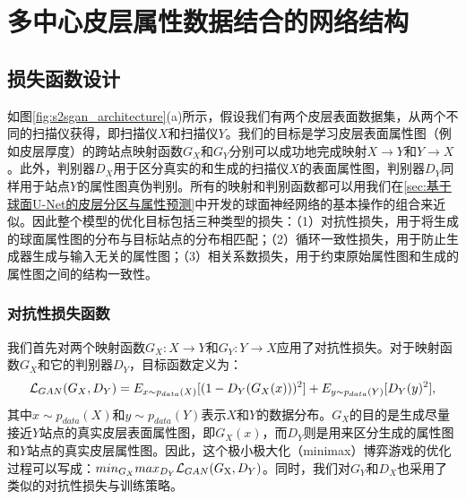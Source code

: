 \section{多中心皮层属性数据结合的网络结构}

\subsection{损失函数设计}
如图\ref{fig:s2sgan_architecture}(a)所示，假设我们有两个皮层表面数据集，从两个不同的扫描仪获得，即扫描仪$X$和扫描仪$Y$。我们的目标是学习皮层表面属性图（例如皮层厚度）的跨站点映射函数$G_X$和$G_Y$分别可以成功地完成映射$X\rightarrow Y$和$Y\rightarrow X$。此外，判别器$D_X$用于区分真实的和生成的扫描仪$X$的表面属性图，判别器$D_Y$同样用于站点$Y$的属性图真伪判别。所有的映射和判别函数都可以用我们在\ref{sec:基于球面U-Net的皮层分区与属性预测}中开发的球面神经网络的基本操作的组合来近似。因此整个模型的优化目标包括三种类型的损失：（1）对抗性损失，用于将生成的球面属性图的分布与目标站点的分布相匹配；（2）循环一致性损失，用于防止生成器生成与输入无关的属性图；（3）相关系数损失，用于约束原始属性图和生成的属性图之间的结构一致性。
	
\subsubsection{对抗性损失函数}
我们首先对两个映射函数$G_X:X\rightarrow Y$和$G_Y:Y\rightarrow X$应用了对抗性损失。对于映射函数$G_X$和它的判别器$D_Y$，目标函数定义为：
\begin{equation}\label{eq:5-1}
	{{\cal L}_{GAN}}({G_X},{D_Y}) = {E_{x\sim{p_{data}}(X)}}[{(1 - {D_Y}({G_X}(x)))^{\rm{2}}}] + {E_{y\sim{p_{data}}(Y)}}[{D_Y}{(y)^2}],
\end{equation}
其中$x\sim p_{data}(X)$和$y\sim p_{data}(Y)$表示$X$和$Y$的数据分布。$G_X$的目的是生成尽量接近$Y$站点的真实皮层表面属性图，即$G_X(x)$，而$D_Y$则是用来区分生成的属性图和$Y$站点的真实皮层属性图。因此，这个极小极大化（minimax）博弈游戏的优化过程可以写成：$mi{n_{{G_X}}}ma{x_{{D_Y}}}{{\cal L}_{GAN}}({G_{\rm{X}}},{D_Y})$。同时，我们对$G_Y$和$D_X$也采用了类似的对抗性损失与训练策略。

